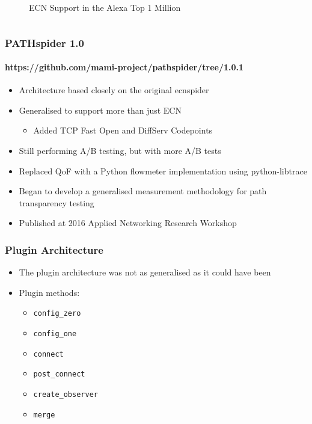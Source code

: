 \documentclass[handout,notes]{beamer}
\begin{document}
\begin{frame}
\begin{columns}[T]
\begin{column}{.35\textwidth}
\begin{figure}
    \caption{ECN Support in the Alexa Top 1 Million}
    \end{figure}
  \end{column}
\end{columns}
\end{frame}

\begin{frame}
\frametitle{PATHspider 1.0}
\framesubtitle{https://github.com/mami-project/pathspider/tree/1.0.1}
\begin{itemize}[<+->]
\item{Architecture based closely on the original ecnspider}
\item{Generalised to support more than just ECN}
\begin{itemize}
\item{Added TCP Fast Open and DiffServ Codepoints}
\end{itemize}
\item{Still performing A/B testing, but with more A/B tests}
\item{Replaced QoF with a Python flowmeter implementation using python-libtrace}
\item{Began to develop a generalised measurement methodology for path
      transparency testing}
\item{Published at 2016 Applied Networking Research Workshop~\cite{PATHspider2016}}
\end{itemize}
\end{frame}

\begin{frame}
\frametitle{Plugin Architecture}
\begin{itemize}[<+->]
\item{The plugin architecture was not as generalised as it could have been}
\item{Plugin methods:}
\begin{itemize}
\item{\texttt{config\_zero}}
\item{\texttt{config\_one}}
\item{\texttt{connect}}
\item{\texttt{post\_connect}}
\item{\texttt{create\_observer}}
\item{\texttt{merge}}
\end{itemize}
\end{itemize}
\end{frame}
\end{document}
